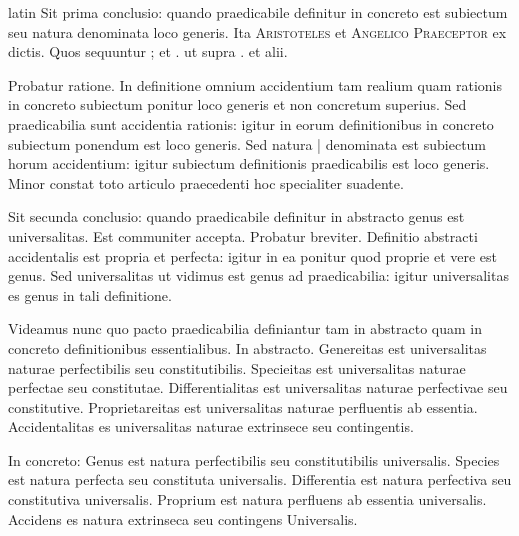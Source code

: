 \begin{otherlanguage*}{latin}
\pstart
 Sit prima conclusio: quando praedicabile definitur in concreto est subiectum seu natura denominata loco generis. Ita \textsc{Aristoteles} et \textsc{Angelico Praeceptor} ex dictis. Quos sequuntur ;  et .  ut supra .  et alii. 
\pend

\pstart
 Probatur ratione. In definitione omnium accidentium tam realium quam rationis in concreto subiectum ponitur loco generis et non concretum superius. Sed praedicabilia sunt accidentia rationis: igitur in eorum definitionibus in concreto subiectum ponendum est loco generis. Sed natura \textnormal{|} denominata est subiectum horum accidentium: igitur subiectum definitionis praedicabilis est loco generis. Minor constat toto articulo praecedenti hoc specialiter suadente. 
\pend

\pstart
 Sit secunda conclusio: quando praedicabile definitur in abstracto genus est universalitas. Est communiter accepta. Probatur breviter. Definitio abstracti accidentalis est propria et perfecta: igitur in ea ponitur quod proprie et vere est genus. Sed universalitas ut vidimus est genus ad praedicabilia: igitur universalitas es genus in tali definitione. 
\pend

\pstart
 Videamus nunc quo pacto praedicabilia definiantur tam in abstracto quam in concreto definitionibus essentialibus. In abstracto. Genereitas est universalitas naturae perfectibilis seu constitutibilis. Specieitas est universalitas naturae perfectae seu constitutae. Differentialitas est universalitas naturae perfectivae seu constitutive. Proprietareitas est universalitas naturae perfluentis ab essentia. Accidentalitas es universalitas naturae extrinsece seu contingentis. 
\pend

\pstart
 In concreto: Genus est natura perfectibilis seu constitutibilis universalis. Species est natura perfecta seu constituta universalis. Differentia est natura perfectiva seu constitutiva universalis. Proprium est natura perfluens ab essentia universalis. Accidens es natura extrinseca seu contingens Universalis. 
\pend


\end{otherlanguage*}
